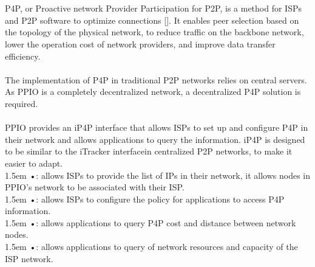 \documentclass[10pt,a4paper]{article}
\newcommand\hl{\bgroup\markoverwith
  {\textcolor{lightgray}{\rule[-.5ex]{.1pt}{2.5ex}}}\ULon}
\begin{document}
 \vspace{-0.5em}
  \\ \\ P4P, or Proactive network Provider Participation for P2P\cite{article17}, is a method for ISPs and P2P software to optimize connections []. It enables peer selection based on the topology of the physical network, to reduce traffic on the backbone network, lower the operation cost of network providers, and improve data transfer efficiency. 
  \vspace{-0.5em}
  \\ \\The implementation of P4P in traditional P2P networks relies on central servers. As PPIO is a completely decentralized network, a decentralized P4P solution is required.
  \vspace{-0.5em}
    \\ \\PPIO provides an iP4P interface that allows ISPs to set up and configure P4P in their network and allows applications to query the information. iP4P is designed to be similar to the iTracker interface\cite{article17}in centralized P2P networks, to make it easier to adapt.
    \vspace{-0.8em}
\\

\hangindent 1.5em
\noindent   
•: allows ISPs to provide the list of IPs in their network, it allows nodes in PPIO’s network to be associated with their ISP.
\vspace{-0.8em}                                                      %
\\

\hangindent 1.5em
\noindent   
•: allows ISPs to configure the policy for applications to access P4P information.
\vspace{-0.8em}
\\

\hangindent 1.5em
\noindent   
•: allows applications to query P4P cost and distance between network nodes.
\vspace{-0.8em}
\\

\hangindent 1.5em
\noindent   
•: allows applications to query of network resources and capacity of the ISP network.
\vspace{-0.8em}
\\
\end{document}
